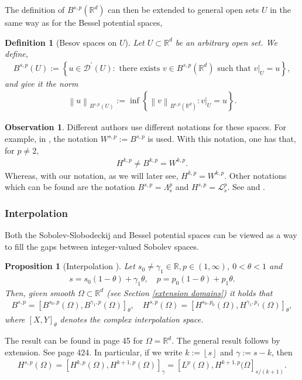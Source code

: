 \documentclass[
    a4paper,
    DIV=14,
    abstract=true,
    numbers=noenddot
]
{scrartcl}
\newtheorem{proposition}[theorem]{Proposition}
\newtheorem{definition}[theorem]{Definition}
\theoremstyle{definition}
\newtheorem{observation}{Observation}
\newcommand{\set}[1]{\left\{#1\right\}}
\renewcommand{\norm}[1]{\left\lVert #1 \right\rVert}\renewcommand{\abs}[1]{\left| #1 \right|}
\newcommand\restr[2]{\left.#1\right|_{#2}}
\newcommand{\R}{\mathbb{R}}
\newcommand{\Ll}{\mathcal{L}}
\begin{document}
The definition of $B^{s,p}(\R^d)$ can then be extended to general open sets $U$ in the same way as for the Bessel potential spaces,
\begin{definition}[Besov spaces on $U$]
  Let $U \subset \R^d$ be an arbitrary open set. We define,
  \begin{align*}
    B^{s,p}(U):=\left\{u \in \mathcal{D}^{\prime}(U): \text{ there exists } v \in B^{s,p}(\R^d) \text{ such that } \restr{v}{U}=u\right\},
  \end{align*}
  and give it the norm
  \begin{align*}
    \norm{u}_{B^{s,p}(U)}:= \inf \set{\norm{v}_{B^{s,p}(\R^d)}: \restr{v}{U}=u}.
  \end{align*}
\end{definition}
\begin{observation}
  Different authors use different notations for these spaces. For example, in \cite{triebel1992theory}, the notation $W^{s,p}:= B^{s,p}$ is used. With this notation, one has that, for $p \neq 2$,
  \begin{align*}
    H^{k,p} \neq B^{k,p}= W^{k,p}.
  \end{align*}
  Whereas, with our notation, as we will later see, $H^{k,p}=W^{k,p}$. Other notations which can be found are  the notation $B^{s,p}= \Lambda^{p}_s$ and $H^{s,p}= \Ll ^{p}_s$. See \cite{stein1970singular} and \cite{biccari2018local}.
\end{observation}
\subsubsection{Interpolation}
Both the Sobolev-Slobodeckij and Bessel potential spaces can be viewed as a way to fill the gaps between integer-valued Sobolev spaces.
\begin{proposition}[Interpolation ]\label{interpolation}
  Let $s_0 \neq \gamma_1 \in \R, p \in (1, \infty)$, $0<\theta<1$ and
  \begin{align*}
    s=s_0(1-\theta)+\gamma_1 \theta, \quad p=p_0(1-\theta)+p_1 \theta.
  \end{align*}
  Then, given smooth $\Omega \subset \R^d$ (see Section \ref{extension domains}) it holds that
  \begin{align*}
    B^{s,p}=\left[B^{s_0,p}(\Omega ), B^{\gamma_1, p}(\Omega )\right]_\theta,\quad H^{s,p}(\Omega )=\left[H^{s_0,p_0}(\Omega), H^{\gamma_1,p_1}(\Omega)\right]_{\theta},
  \end{align*}
  where $[X,Y]_\theta$ denotes the complex interpolation space.
\end{proposition}
The result can be found in \cite{triebel1992theory} page 45 for $\Omega = \R^d$. The general result follows by extension. See \cite{leoni2017first} page 424. In particular, if we write $k:=\left\lfloor s \right\rfloor$ and $\gamma:=s-k$, then
\begin{align*}
  H^{s,p}(\Omega )=\left[H^{k,p}(\Omega), H^{k+1,p}(\Omega)\right]_{\gamma }= \left[L^p(\Omega ), H^{k+1,p}(\Omega\right]_{s/(k+1) }.
\end{align*}
\end{document}
